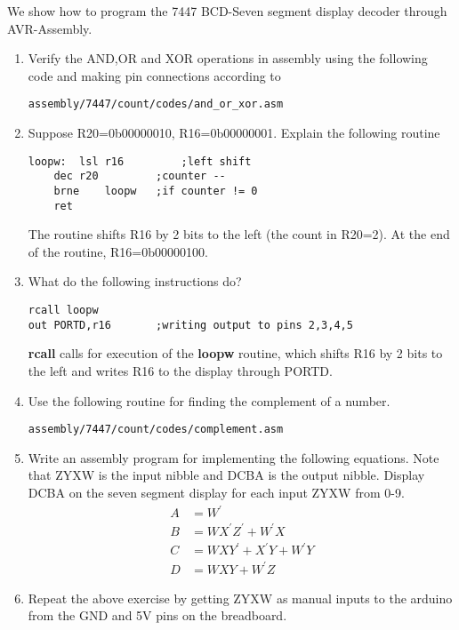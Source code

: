 %
We show how to program the 7447 BCD-Seven segment
display decoder through AVR-Assembly.

%
\begin{enumerate}[label=\arabic*.,ref=\theenumi]
\item Verify the AND,OR and XOR operations in assembly using the following code and making pin connections according to 
\begin{lstlisting}
assembly/7447/count/codes/and_or_xor.asm
\end{lstlisting}
%
\item Suppose R20=0b00000010, R16=0b00000001.  Explain the following routine
\begin{lstlisting}
loopw:	lsl r16			;left shift
	dec r20			;counter --
	brne	loopw	;if counter != 0
	ret
\end{lstlisting}
\solution The routine shifts R16 by 2 bits to the left (the count in R20=2).  At the end of the routine, R16=0b00000100.
\item What do the following instructions do?
\begin{lstlisting}
rcall loopw		
out PORTD,r16		;writing output to pins 2,3,4,5
\end{lstlisting}
\solution \textbf{rcall} calls for execution of the \textbf{loopw} routine, which shifts R16 by 2 bits to the left and writes R16 to the display through PORTD.
\item Use the following  routine for finding the complement of a number.
\begin{lstlisting}
assembly/7447/count/codes/complement.asm
\end{lstlisting}
\item Write an assembly program for implementing the following equations. Note that ZYXW is the input nibble and DCBA is the output nibble.  Display DCBA on the seven segment display for each input ZYXW from 0-9.
%
\begin{align}
A &= W^{\prime}
\\
B &= WX^{\prime} Z^{\prime} + W^{\prime}X
\\
C &= WXY^{\prime}+X^{\prime}Y + W^{\prime}Y
\\
D &= WXY + W^{\prime}Z
\end{align}
%
\item Repeat the above exercise by getting ZYXW as manual inputs to the arduino from the GND and 5V pins on the breadboard.
%
\end{enumerate}
%


